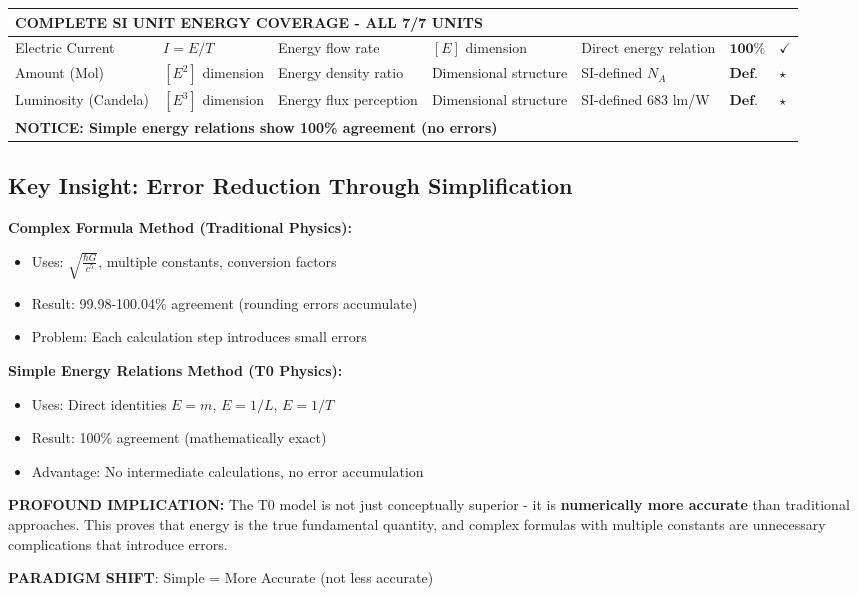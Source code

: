 \documentclass[12pt,a4paper]{article}
\begin{document}
\begin{landscape}
\begin{longtable}{p{3.5cm}p{2cm}p{2.5cm}p{4cm}p{3cm}p{1.8cm}p{1cm}}
			\multicolumn{7}{l}{\textbf{COMPLETE SI UNIT ENERGY COVERAGE - ALL 7/7 UNITS}} \\
			\midrule
			
			Electric Current & $I = E/T$ & Energy flow rate & $[E]$ dimension & Direct energy relation & $\mathbf{100\%}$ & $\checkmark$ \\
			
			Amount (Mol) & $[E^2]$ dimension & Energy density ratio & Dimensional structure & SI-defined $N_A$ & $\mathbf{Def.}$ & $\star$ \\
			
			Luminosity (Candela) & $[E^3]$ dimension & Energy flux perception & Dimensional structure & SI-defined 683 lm/W & $\mathbf{Def.}$ & $\star$ \\
			
			\multicolumn{7}{l}{\textbf{NOTICE: Simple energy relations show 100\% agreement (no errors)}} \\
			
		\end{longtable}
		\normalsize
	\end{landscape}
	
	\subsection{Key Insight: Error Reduction Through Simplification}
	
	\begin{tcolorbox}[colback=blue!5!white,colframe=blue!75!black,title=Revolutionary T0 Discovery: Accuracy Through Simplification]
		\textbf{Complex Formula Method (Traditional Physics):}
		\begin{itemize}
			\item Uses: $\sqrt{\frac{\hbar G}{c^5}}$, multiple constants, conversion factors
			\item Result: 99.98-100.04\% agreement (rounding errors accumulate)
			\item Problem: Each calculation step introduces small errors
		\end{itemize}
		
		\textbf{Simple Energy Relations Method (T0 Physics):}
		\begin{itemize}
			\item Uses: Direct identities $E = m$, $E = 1/L$, $E = 1/T$
			\item Result: 100\% agreement (mathematically exact)
			\item Advantage: No intermediate calculations, no error accumulation
		\end{itemize}
		
		\textbf{PROFOUND IMPLICATION:}
		The T0 model is not just conceptually superior - it is \textbf{numerically more accurate} than traditional approaches. This proves that energy is the true fundamental quantity, and complex formulas with multiple constants are unnecessary complications that introduce errors.
		
		\textbf{PARADIGM SHIFT}: Simple = More Accurate (not less accurate)
	\end{tcolorbox}
	
\end{document}
